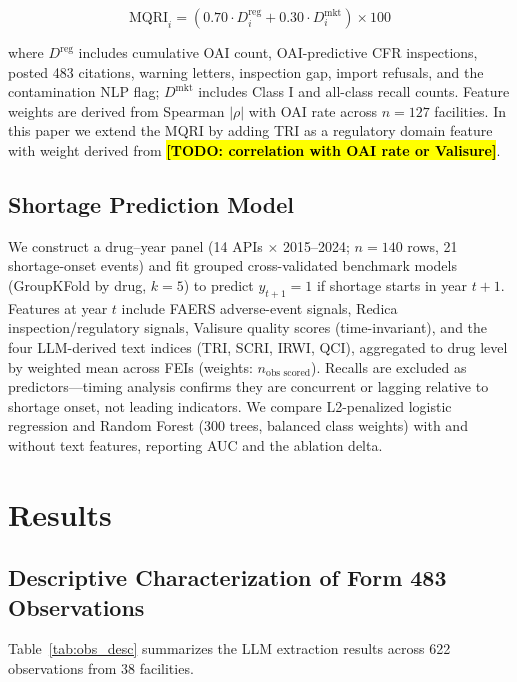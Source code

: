 \documentclass[12pt]{article}
\newcommand{\todo}[1]{\hl{\textbf{[TODO: #1]}}}
\begin{document}
\begin{equation}
  \text{MQRI}_i = \left( 0.70 \cdot D^{\text{reg}}_i
                         + 0.30 \cdot D^{\text{mkt}}_i \right) \times 100
\end{equation}

where $D^{\text{reg}}$ includes cumulative OAI count, OAI-predictive CFR
inspections, posted 483 citations, warning letters, inspection gap, import
refusals, and the contamination NLP flag; $D^{\text{mkt}}$ includes Class I
and all-class recall counts.
Feature weights are derived from Spearman $|\rho|$ with OAI rate across
$n = 127$ facilities.
In this paper we extend the MQRI by adding TRI as a regulatory domain feature
with weight derived from \todo{correlation with OAI rate or Valisure}.

\subsection{Shortage Prediction Model}

We construct a drug--year panel (14 APIs $\times$ 2015--2024; $n=140$ rows,
21 shortage-onset events) and fit grouped cross-validated benchmark models
(GroupKFold by drug, $k=5$) to predict $y_{t+1} = 1$ if shortage starts in
year $t+1$.
Features at year $t$ include FAERS adverse-event signals, Redica
inspection/regulatory signals, Valisure quality scores (time-invariant), and
the four LLM-derived text indices (TRI, SCRI, IRWI, QCI), aggregated to
drug level by weighted mean across FEIs (weights: $n_{\text{obs scored}}$).
Recalls are excluded as predictors---timing analysis confirms they are
concurrent or lagging relative to shortage onset, not leading indicators.
We compare L2-penalized logistic regression and Random Forest (300 trees,
balanced class weights) with and without text features, reporting AUC and
the ablation delta.

\section{Results}
\label{sec:results}

\subsection{Descriptive Characterization of Form 483 Observations}

Table~\ref{tab:obs_desc} summarizes the LLM extraction results across
622 observations from 38 facilities.
\end{document}
